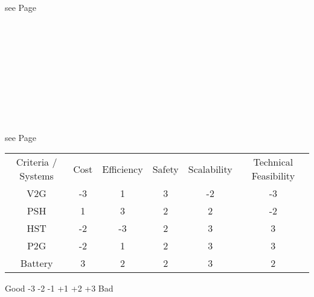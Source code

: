 \begin{parcolumns}[colwidths={1=2.5 cm, 2=10 cm, 3=2.5cm}]{3}
{\begin{tiny}
see Page \pageref{PowertoGas_Christian} \\ \\ \\ \\ \\ \\ \\ \\ \\ \\ \\
see Page \pageref{Batteries} 
\end{tiny}
}
\end{parcolumns}

\begin{table} 
\centering 
\begin{tabular}{cccccc}
Criteria / Systems & Cost & Efficiency & Safety & Scalability & Technical Feasibility \\ 
V2G & -3 & 1 & 3 & -2 & -3 \\
PSH & 1 & 3 & 2 & 2 & -2 \\
HST & -2 & -3 & 2 & 3 & 3 \\
P2G & -2 & 1 & 2 & 3 & 3 \\
Battery & 3 & 2 & 2 & 3 & 2 \\
\end{tabular}
\end{table}
                    Good	-3	-2	-1	+1	+2	+3	  Bad

